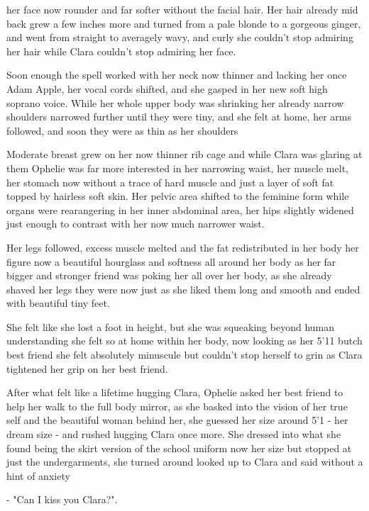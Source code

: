 \documentclass[hidelinks,12pt]{book}
\begin{document}
her face now rounder and far softer without the facial hair. Her hair already mid back grew a few inches more and 
turned from a pale blonde to a gorgeous ginger, and went from straight to averagely wavy, and curly she couldn't stop 
admiring her hair while Clara couldn't stop admiring her face.\par 
\bigskip
Soon enough the spell worked with her neck now thinner and lacking her once Adam Apple, her vocal cords shifted, and she
 gasped in her new soft high soprano voice. While her whole upper body was shrinking her already narrow shoulders 
 narrowed further until they were tiny, and she felt at home, her arms followed, and soon they were as thin as her 
 shoulders\par 
 \bigskip
Moderate breast grew on her now thinner rib cage and while Clara was glaring at them Ophelie was far more interested 
in her narrowing waist, her muscle melt, her stomach now without a trace of hard muscle and just a layer of soft fat 
topped by hairless soft skin. Her pelvic area shifted to the feminine form while organs were rearangering in her inner 
abdominal area, her hips slightly widened just enough to contrast with her now much narrower waist. \par 
\bigskip
Her legs followed, excess muscle melted and the fat redistributed in her body her figure now a beautiful hourglass and 
softness all around her body as her far bigger and stronger friend was poking her all over her body, as she already 
shaved her legs they were now just as she liked them long and smooth and ended with beautiful tiny feet.\par 
\bigskip 
She felt like she lost a foot in height, but she was squeaking beyond human understanding she felt so at home within her
body, now looking as her 5'11 butch best friend she felt absolutely minuscule but couldn't stop herself to grin as Clara 
tightened her grip on her best friend.\par 
\bigskip
After what felt like a lifetime hugging Clara, Ophelie asked her best friend to help her walk to the full body mirror, 
as she basked into the vision of her true self and the beautiful woman behind her, she guessed her size around 5'1 - 
her dream size - and rushed hugging Clara once more. She dressed into what she found being the skirt version of 
the school uniform now her size but stopped at just the undergarments, she turned around looked up to Clara and said 
without a hint of anxiety\par 
\bigskip
- "Can I kiss you Clara?".
\end{document}
